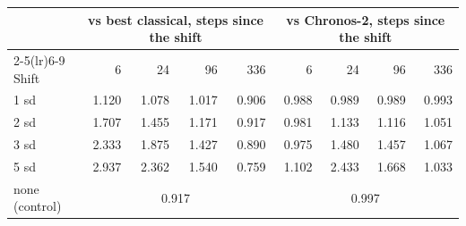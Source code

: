 \begin{tabular}{lrrrrrrrr}
\toprule
 & \multicolumn{4}{c}{vs best classical, steps since the shift} & \multicolumn{4}{c}{vs Chronos-2, steps since the shift} \\
\cmidrule(lr){2-5}\cmidrule(lr){6-9}
Shift & 6 & 24 & 96 & 336 & 6 & 24 & 96 & 336 \\
\midrule
1 sd & 1.120 & 1.078 & 1.017 & 0.906 & 0.988 & 0.989 & 0.989 & 0.993 \\
2 sd & 1.707 & 1.455 & 1.171 & 0.917 & 0.981 & 1.133 & 1.116 & 1.051 \\
3 sd & 2.333 & 1.875 & 1.427 & 0.890 & 0.975 & 1.480 & 1.457 & 1.067 \\
5 sd & 2.937 & 2.362 & 1.540 & 0.759 & 1.102 & 2.433 & 1.668 & 1.033 \\
none (control) & \multicolumn{4}{c}{0.917} & \multicolumn{4}{c}{0.997} \\
\bottomrule
\end{tabular}
